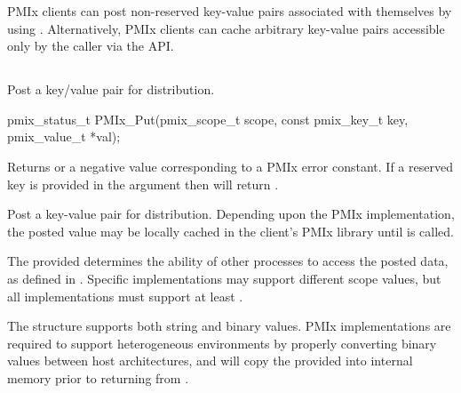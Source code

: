 \ac{PMIx} clients can post non-reserved key-value pairs associated with themselves by using . Alternatively, \ac{PMIx} clients can cache arbitrary key-value pairs accessible only by the caller via the  \ac{API}.


\subsection{}

\summary

Post a key/value pair for distribution.

\format

\cspecificstart
\begin{codepar}
pmix_status_t
PMIx_Put(pmix_scope_t scope,
         const pmix_key_t key,
         pmix_value_t *val);
\end{codepar}
\cspecificend

\begin{arglist}
\end{arglist}

Returns  or a negative value corresponding to a \ac{PMIx} error constant.
If a reserved key is provided in the  argument then  will return .

\descr

Post a key-value pair for distribution. Depending upon the \ac{PMIx} implementation, the posted value may be locally cached in the client's \ac{PMIx} library until  is called.

The provided  determines the ability of other processes to access the posted data, as defined in .
Specific implementations may support different scope values, but all implementations must support at least .

The  structure supports both string and binary values.
\ac{PMIx} implementations are required to support heterogeneous environments by properly converting binary values between host architectures, and will copy the provided  into internal memory prior to returning from .

